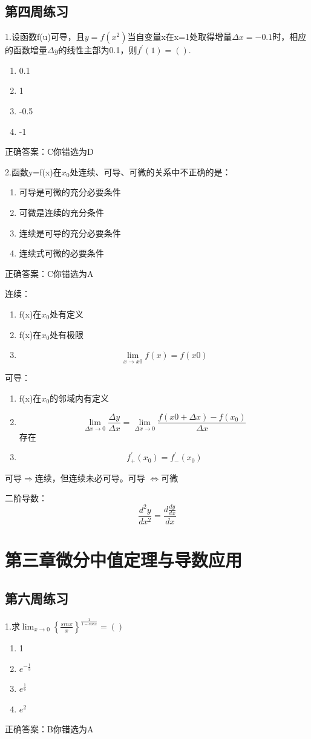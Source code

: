 \documentclass[fleqn]{article}
\begin{document}
\begin{flushleft}
\subsection{第四周练习}
1.设函数f(u)可导，且$y=f(x^2)$当自变量x在x=1处取得增量$\Delta x=-0.1$时，相应的函数增量$\Delta y$的线性主部为0.1，则$f^{'}(1)=().$
\begin{enumerate}
\item 0.1
\item 1
\item -0.5
\item -1
\end{enumerate}
正确答案：C你错选为D

2.函数y=f(x)在$x_0$处连续、可导、可微的关系中不正确的是：
\begin{enumerate}
\item 可导是可微的充分必要条件
\item 可微是连续的充分条件
\item 连续是可导的充分必要条件
\item 连续式可微的必要条件
\end{enumerate}
正确答案：C你错选为A
\par
连续：
\begin{enumerate}
\item f(x)在$x_0$处有定义
\item f(x)在$x_0$处有极限
\item \[\lim_{x\to x0}f(x)=f(x0)\]
\end{enumerate}
可导：
\begin{enumerate}
\item f(x)在$x_0$的邻域内有定义
\item \[\lim_{\Delta x\to 0}\frac{\Delta y}{\Delta x}=\lim_{\Delta x\to 0}\frac{f(x0+\Delta x)-f(x_0)}{\Delta x}\]存在
\item \[f_{+}^{'}(x_0)=f_{-}^{'}(x_0)\]
\end{enumerate}
可导$\Longrightarrow$连续，但连续未必可导。可导
$\Longleftrightarrow$可微

二阶导数：\[\frac{d^2y}{dx^2}=\frac{d\frac{dy}{dx}}{dx}\]

\section{第三章微分中值定理与导数应用}
\subsection{第六周练习}
1.求$\lim_{x\to 0}\left\lbrace\frac{sinx}{x}\right\rbrace^\frac{1}{1-cosx}=()$
\begin{enumerate}
\item 1
\item $e^{-\frac{1}{3}}$
\item $e^{\frac{1}{6}}$
\item $e^2$
\end{enumerate}
正确答案：B你错选为A

\end{flushleft}
\end{document}

